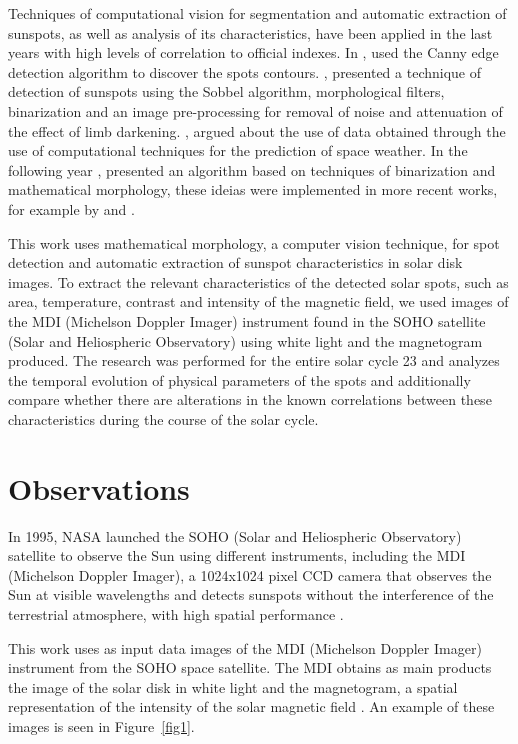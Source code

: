 \documentclass[namedreferences]{solarphysics}
\begin{document}
\begin{article}
Techniques of computational vision for segmentation and automatic extraction of sunspots,
as well as analysis of its characteristics,
have been applied in the last years with high levels of correlation to official indexes.
In \citeyear{zharkova2003}, \citeauthor{zharkova2003} used the Canny edge detection algorithm to discover the spots contours.
\citealp{zharkov2005}, presented a technique of detection of sunspots using the Sobbel algorithm,
morphological filters, binarization and an image pre-processing for removal of noise and attenuation of the effect of limb darkening.
\citealp{colak2007}, argued about the use of data obtained through the use of computational techniques for the prediction of space weather.
In the following year \citealp{curto2008}, presented an algorithm based on techniques of binarization and mathematical morphology,
these ideias were implemented in more recent works, for example by \citealp{spagiari2012} and \citealp{curto2008}.

This work uses mathematical morphology,
a computer vision technique, 
for spot detection and automatic extraction of sunspot characteristics in solar disk images.
To extract the relevant characteristics of the detected solar spots, such as area, temperature, 
contrast and intensity of the magnetic field, we used images of the MDI (Michelson Doppler Imager)
instrument found in the SOHO satellite (Solar and Heliospheric Observatory)
using white light and the magnetogram produced.
The research was performed for the entire solar cycle 23 and analyzes the temporal evolution of physical
parameters of the spots and additionally compare whether there are alterations in the known correlations 
between these characteristics during the course of the solar cycle.

\section{Observations}
\label{S-obs}
In 1995, NASA launched the SOHO (Solar and Heliospheric Observatory) satellite to observe the Sun using different instruments, including the MDI (Michelson Doppler Imager),
a 1024x1024 pixel CCD camera that observes the Sun at visible wavelengths and detects sunspots without the interference of the terrestrial atmosphere, with high spatial performance \citep{scherrer1991}.

This work uses as input data images of the MDI (Michelson Doppler Imager) instrument from the SOHO space satellite.
The MDI obtains as main products the image of the solar disk in white light and the magnetogram, a spatial representation of the intensity of the solar magnetic field \citep{scherrer1991}.
An example of these images is seen in Figure~\ref{fig1}.


\end{article}
\end{document}
